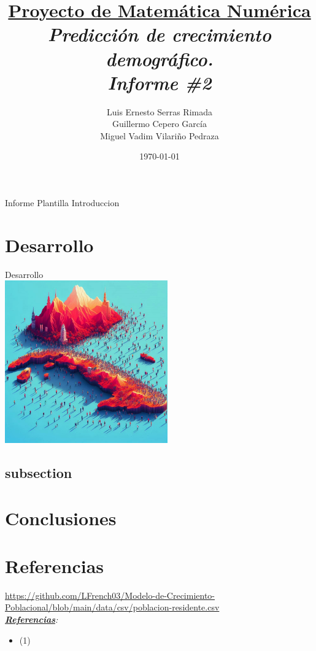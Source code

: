 \documentclass{article}
\title{\textbf{\underline{Proyecto de Matemática Numérica}} \\ \textit{Predicción de crecimiento demográfico.} \\ \textit{Informe \#2}}
\author{Luis Ernesto Serras Rimada \\ Guillermo Cepero García \\ Miguel Vadim Vilariño Pedraza}
\date{\today}
\begin{document}
\maketitle
    Informe Plantilla
    \tableofcontents
    Introduccion
\newpage
\section{Desarrollo}
Desarrollo\\
\includegraphics[height = 7cm]{img/cuba3.jpeg}

\newpage
\subsection{subsection}
\clearpage

\section{Conclusiones}

\cleardoublepage
\section{Referencias}
\url{https://github.com/LFrench03/Modelo-de-Crecimiento-Poblacional/blob/main/data/csv/poblacion-residente.csv}
\\\textit{\textbf{\underline{Referencias}}:}
\begin{itemize}
    \item (1)
\end{itemize}
\end{document}
